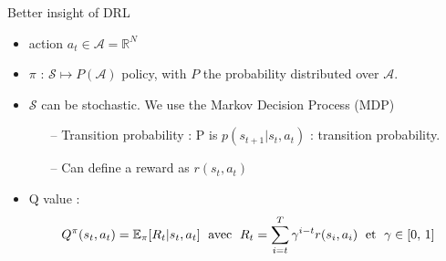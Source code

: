 \documentclass[10pt,
			   xcolor=svgnames,
			   hyperref={linkcolor=red, citecolor = DarkGreen, colorlinks=true, urlcolor=Navy}]{beamer}
\newcommand{\bepar}[1]{
	\left( #1 \right)  
}
\newcommand{\becro}[1]{
	\left[ #1 \right]  
}
\newcommand{\sarrow}{\item[\color{blue!50!black!70!orange!60} \tiny{\ding{55}}]}
\begin{document}
\begin{frame}{Better insight of DRL}
	\begin{itemize}
		\sarrow action $a_t \in \mathcal{A} = \mathbb{R}^N$ \\[3mm]
		\sarrow $\pi$ : $\mathcal{S} \mapsto P\bepar{\mathcal{A}}$ policy, with $P$ the probability distributed over $\mathcal{A}$.\\[3mm]
		\sarrow $\mathcal{S}$ can be stochastic. We use the Markov Decision Process (MDP) \\[3mm]
		\begin{itemize}
			\item[--] Transition probability : P is $p(s_{t+1} | s_t, a_t)$ : transition probability. 				
			\item[--] Can define a reward as $r(s_t, a_t)$ \\[3mm]
		\end{itemize}
		\sarrow Q value : $$Q^\pi(s_t, a_t) = \mathbb{E}_\pi[R_t |s_t, a_t] \text{\hspace{1mm} avec \hspace{1mm}} R_t = \sum^T_{i=t} \gamma^{i-t} r(s_i, a_i) \text{\hspace{1mm} et \hspace{1mm}} \gamma \in \becro{0,\, 1}$$ 
	
			   
	\end{itemize}
\end{frame}

\begin{frame}


\end{frame}


\end{document}

